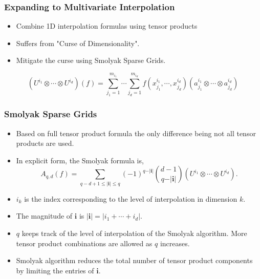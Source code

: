 \documentclass{beamer}
\begin{document}
\begin{frame}
\frametitle{Expanding to Multivariate Interpolation}

\begin{itemize}  
  \item Combine 1D interpolation formulas using tensor products
  \item Suffers from "Curse of Dimensionality".
  \item Mitigate the curse using Smolyak Sparse Grids.        
\end{itemize}

\begin{equation} 
    \left(U^{i_1} \otimes\cdots\otimes U^{i_d}\right)\left(f\right) = 
     \sum_{j_1=1}^{m_{i_1}} \cdots
      \sum_{j_d=1}^{m_{i_d}} f\left(
       x_{j_1}^{i_1},\cdots,x_{j_d}^{i_d}\right)
        \left(a_{j_1}^{i_1}\otimes\cdots\otimes a_{j_d}^{i_d}\right) \nonumber
\end{equation} 

\end{frame}
\begin{frame}
\frametitle{Smolyak Sparse Grids}

\begin{itemize}  
  \item Based on full tensor product formula the only difference being not all tensor products are used. 
  \item In explicit form, the Smolyak formula is,
\begin{equation} 
    A_{q,d}(f) = 
     \sum_{q-d+1\leq \vert \textbf{i}\vert\leq q}
      \left(-1\right)^{q-\vert\textbf{i}\vert}
       \binom{d-1}{q-\vert\textbf{i}\vert}
        \left(U^{i_1} \otimes\cdots\otimes U^{i_d}\right). \nonumber
\end{equation}  
  \item $i_k$ is the index corresponding to the level of interpolation in dimension $k$. 
  \item The magnitude of $\textbf{i}$ is $\vert\textbf{i}\vert = \vert i_1 +\cdots+ i_d\vert$. 
  \item $q$ keeps track of the level of interpolation of the Smolyak algorithm. More tensor product combinations are allowed as $q$ increases. 
  \item Smolyak algorithm reduces the total number of tensor product components by limiting the entries of $\textbf{i}$.     
\end{itemize}

\end{frame}
\end{document}
